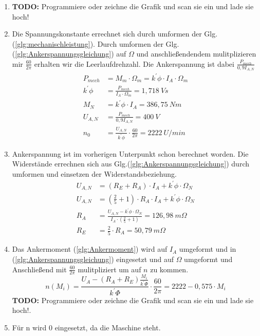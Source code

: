 \begin{solution}
\begin{enumerate}
\item \textbf{TODO:} Programmiere oder zeichne die Grafik und scan sie ein und lade sie hoch!
\item Die Spannungskonstante errechnet sich durch umformen der Glg.(\ref{glg:mechanischleistung}). Durch umformen der Glg.(\ref{glg:Ankerspannungsgleichung}) auf $\Omega$ und anschließendendem mulitplizieren mir $\frac{60}{2 \pi}$ erhalten wir die Leerlaufdrehzahl. Die Ankerspannung ist dabei $\frac{P_{mech}}{0,9 I_{A,N}}$
\begin{align}
P_{mech} &=M_m \cdot \Omega_m = k^{'} \phi \cdot I_A \cdot \Omega_m\\
k^{'} \phi &= \frac{P_{mech}}{I_A \cdot \Omega_m} =1,718~Vs\\
M_N &= k^{'} \phi \cdot I_A = 386,75~Nm\\
U_{A,N} &= \frac{P_{mech}}{0,9 I_{A,N}} =400~V\\
n_0 &= \frac{U_{A,N}}{k^{'} \phi} \cdot \frac{60}{2\pi} =2222~U/min
\end{align}
\item Ankerspannung ist im vorherigen Unterpunkt schon berechnet worden. Die Widerstände errechnen sich aus Glg.(\ref{glg:Ankerspannungsgleichung}) durch umformen und einsetzen der Widerstandsbeziehung.
\begin{align}
U_{A,N} &= (R_E + R_A) \cdot I_A +  k^{'} \phi \cdot \Omega_N\\
U_{A,N} &= \left (\frac{2}{5} + 1 \right ) \cdot R_A \cdot I_A +  k^{'} \phi \cdot \Omega_N\\
R_A &= \frac{U_{A,N}-k^{'} \phi \cdot \Omega_N}{I_A \cdot \left (\frac{2}{5} + 1 \right )}=126,98~m\Omega\\
R_E &= \frac{2}{5} \cdot R_A= 50,79~m\Omega
\end{align}
\item Das Ankermoment (\ref{glg:Ankermoment}) wird auf $I_A$ umgeformt und in (\ref{glg:Ankerspannungsgleichung}) eingesetzt und auf $\Omega$ umgeformt und Anschließend mit $\frac{60}{2 \pi}$ mulitpliziert um auf $n$ zu kommen.
\begin{equation}
n(M_i) = \frac{U_A - (R_A+R_E) \frac{ M_i}{k^{'} \Phi}}{k^{'}\Phi} \cdot \frac{60}{2 \pi} =2222-0,575 \cdot M_i
\end{equation}
\textbf{TODO:} Programmiere oder zeichne die Grafik und scan sie ein und lade sie hoch!.\\
\item Für n wird $0$ eingesetzt, da die Maschine steht.

\end{enumerate}
\end{solution}
